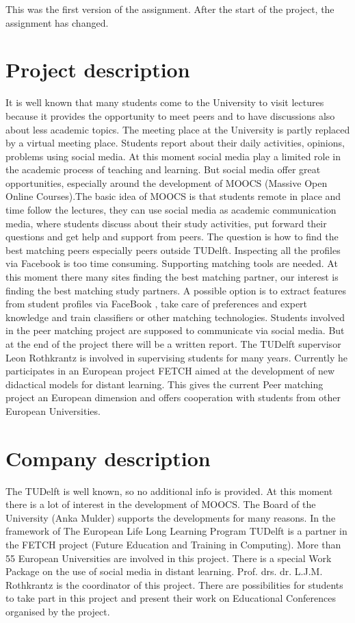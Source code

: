 This was the first version of the assignment. After the start of the project, the assignment has changed.

\section*{Project description}

It is well known that many students come to the University to visit lectures because it provides the opportunity to meet peers and to have discussions also about less academic topics. The meeting place at the University is partly replaced by a virtual meeting place. Students report about their daily activities, opinions, problems using social media. At this moment social media play a limited role in the academic process of teaching and learning. But social media offer great opportunities, especially around the development of MOOCS (Massive Open Online Courses).The basic idea of MOOCS is that students remote in place and time follow the lectures, they can use social media as academic communication media, where students discuss about their study activities, put forward their questions and get help and support from peers. The question is how to find the best matching peers especially peers outside TUDelft. Inspecting all the profiles via Facebook is too time consuming. Supporting matching tools are needed. At this moment there many sites finding the best matching partner, our interest is finding the best matching study partners. A possible option is to extract features from student profiles via FaceBook , take care of preferences and expert knowledge and train classifiers or other matching technologies. Students involved in the peer matching project are supposed to communicate via social media. But at the end of the project there will be a written report. The TUDelft supervisor Leon Rothkrantz is involved in supervising students for many years. Currently he participates in an European project FETCH aimed at the development of new didactical models for distant learning. This gives the current Peer matching project an European dimension and offers cooperation with students from other European Universities.

\section*{Company description}

The TUDelft is well known, so no additional info is provided. At this moment there is a lot of interest in the development of MOOCS. The Board of the University (Anka Mulder) supports the developments for many reasons. In the framework of The European Life Long Learning Program TUDelft is a partner in the FETCH project (Future Education and Training in Computing). More than 55 European Universities are involved in this project. There is a special Work Package on the use of social media in distant learning. Prof. drs. dr. L.J.M. Rothkrantz is the coordinator of this project. There are possibilities for students to take part in this project and present their work on Educational Conferences organised by the project.

